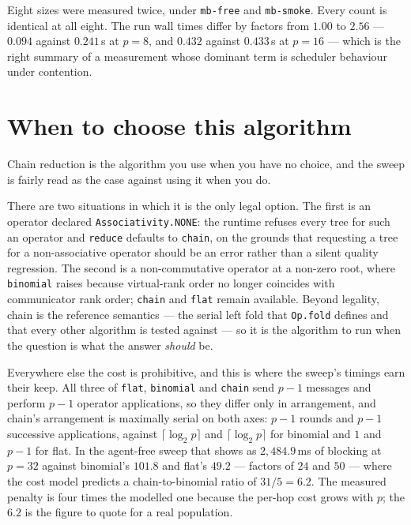 \documentclass[11pt]{article}
\begin{document}
Eight sizes were measured twice, under \texttt{mb-free} and \texttt{mb-smoke}. Every count is
identical at all eight. The run wall times differ by factors from $1.00$ to $2.56$ --- $0.094$
against $0.241$\,s at $p=8$, and $0.432$ against $0.433$\,s at $p=16$ --- which is the right
summary of a measurement whose dominant term is scheduler behaviour under contention.

\section{When to choose this algorithm}

Chain reduction is the algorithm you use when you have no choice, and the sweep is fairly read
as the case against using it when you do.

There are two situations in which it is the only legal option. The first is an operator declared
\texttt{Associativity.NONE}: the runtime refuses every tree for such an operator and
\texttt{reduce} defaults to \texttt{chain}, on the grounds that requesting a tree for a
non-associative operator should be an error rather than a silent quality regression. The second
is a non-commutative operator at a non-zero root, where \texttt{binomial} raises because
virtual-rank order no longer coincides with communicator rank order; \texttt{chain} and
\texttt{flat} remain available. Beyond legality, chain is the reference semantics --- the serial
left fold that \texttt{Op.fold} defines and that every other algorithm is tested against --- so
it is the algorithm to run when the question is what the answer \emph{should} be.

Everywhere else the cost is prohibitive, and this is where the sweep's timings earn their keep.
All three of \texttt{flat}, \texttt{binomial} and \texttt{chain} send $p-1$ messages and perform
$p-1$ operator applications, so they differ only in arrangement, and chain's arrangement is
maximally serial on both axes: $p-1$ rounds and $p-1$ successive applications, against
$\lceil\log_2 p\rceil$ and $\lceil\log_2 p\rceil$ for binomial and $1$ and $p-1$ for flat. In
the agent-free sweep that shows as $2{,}484.9$\,ms of blocking at $p=32$ against binomial's
$101.8$ and flat's $49.2$ --- factors of $24$ and $50$ --- where the cost model predicts a
chain-to-binomial ratio of $31/5 = 6.2$. The measured penalty is four times the modelled one
because the per-hop cost grows with $p$; the $6.2$ is the figure to quote for a real
population.
\end{document}
